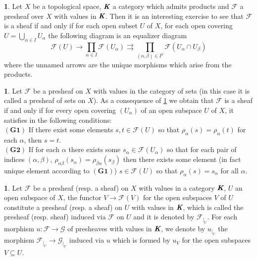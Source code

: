 \documentclass[12pt]{amsart}
\theoremstyle{definition}
\newtheorem{bk}[proposition]{}
\begin{document}
\begin{bk}\label{tanriverdi} Let $X$ be a topological space, $\emph{\textbf{K}}$ a category which admits products and $\mathscr{F}$ a presheaf over $X$ with values in $\emph{\textbf{K}}$. Then it is an interesting exercise to see that $\mathscr{F}$ is a sheaf if and only if for each open subset $U$ of $X$, for each open covering $U=\bigcup\limits_{\alpha\in I}U_{\alpha}$ the following diagram is an equalizer diagram
$$\mathscr{F}(U)\rightarrow\prod\limits_{\alpha\in I} \mathscr{F}(U_{\alpha})\rightrightarrows\prod\limits_{(\alpha,\beta)\in I^{2}} \mathscr{F}(U_{\alpha}\cap U_{\beta})$$ where the unnamed arrows are the unique morphisms which arise from the products.\\
\end{bk}


\begin{bk}\label{1.2} Let $\mathscr{F}$ be a presheaf on $X$ with values in the category of sets (in this case it is called a presheaf of sets on $X$). As a consequence of \ref{tanriverdi} we obtain that $\mathscr{F}$ is a sheaf if and only if for every open covering $(U_{\alpha})$ of an open subspace $U$ of $X$, it satisfies in the following conditions:\\
$(\mathbf{G1})$ If there exist some elements $s, t\in\mathscr{F}(U)$ so that $\rho_{\alpha}(s)=\rho_{\alpha}(t)$ for each $\alpha$, then $s=t$.\\
$(\mathbf{G2})$ If for each $\alpha$ there exists some $s_{\alpha}\in\mathscr{F}(U_{\alpha})$ so that for each pair of indices $(\alpha, \beta)$, $\rho_{\alpha\beta}(s_{\alpha})=\rho_{\beta\alpha}(s_{\beta})$ then there exists some element (in fact unique element according to $(\mathbf{G1})$) $s\in\mathscr{F}(U)$ so that $\rho_{\alpha}(s)=s_{\alpha}$ for all $\alpha$.\\
\end{bk}


\begin{bk}\label{I: 3.1.5} Let $\mathscr{F}$ be a presheaf (resp. a sheaf) on $X$ with values in a category $\emph{\textbf{K}}$, $U$ an open subspace of $X$, the functor
$V\rightarrow\mathscr{F}(V)$ for the open subspaces $V$ of $U$ constitute a presheaf (resp. a sheaf) on $U$ with values in $\emph{\textbf{K}}$, which is called the presheaf (resp. sheaf) induced via $\mathscr{F}$ on $U$ and it is denoted by $\mathscr{F}_{|_{U}}$.
For each morphism $u:\mathscr{F}\rightarrow\mathscr{G}$ of presheaves with values in $\emph{\textbf{K}}$, we denote by $u_{|_{U}}$ the morphism $\mathscr{F}_{|_{U}}\rightarrow\mathscr{G}_{|_{U}}$ induced via $u$ which is formed by $u_{V}$ for the open subspaces $V\subseteq U$.\\
\end{bk}
\end{document}

